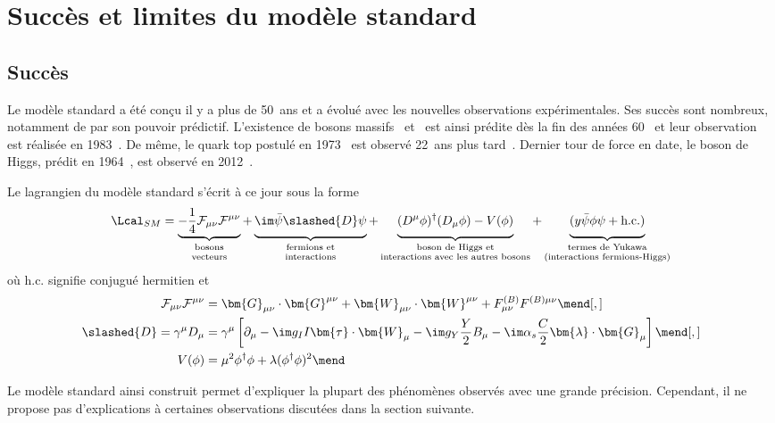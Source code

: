 \section{Succès et limites du modèle standard}\label{chapter-MS-MSSM-section-succes_limites}
\subsection{Succès}\label{chapter-MS-MSSM-section-succes_limites-subsec-succes}
Le modèle standard a été conçu il y a plus de 50~ans et a évolué avec les nouvelles observations expérimentales.
Ses succès sont nombreux, notamment de par son pouvoir prédictif.
L'existence de bosons massifs \Wboson\ et \Zboson\ est ainsi prédite dès la fin des années 60~\cite{Weinberg_leptons_model} et leur observation est réalisée en 1983~\cite{Wboson_discovery1,Wboson_discovery2,Wboson_discovery3,Zboson_discovery1,Zboson_discovery2}.
De même, le quark top postulé en 1973~\cite{CKM_KM} est observé 22~ans plus tard~\cite{top_discovery1,top_discovery2}.
Dernier tour de force en date, le boson de Higgs, prédit en 1964~\cite{Englert_Brout,Higgs_1,Higgs_2,Guralnik_Hagen_Kibble}, est observé en 2012~\cite{ATLAS_Higgs_discovery,CMS_Higgs_discovery}.
\par Le lagrangien du modèle standard s'écrit à ce jour sous la forme
\begin{equation}
\Lcal_{SM} = 
\underbrace{- \frac{1}{4} \mathcal{F}_{\mu\nu}\mathcal{F}^{\mu\nu} \vphantom{\frac{1}{4}}}_{\substack{\text{bosons\vphantom{YHg}}\\\text{vecteurs\vphantom{(lHg)}}}}
+ \underbrace{\im \bar{\psi} \slashed{D} \psi \vphantom{\frac{1}{4}}}_{\substack{\text{fermions et\vphantom{YHg}}\\\text{interactions\vphantom{(lHg)}}}}
+ \underbrace{(D^\mu\phi)^\dagger(D_\mu\phi) - V(\phi) \vphantom{\frac{1}{4}}}_{\substack{\text{boson de Higgs et\vphantom{YHg}}\\\text{interactions avec les autres bosons\vphantom{(lHg)}}}}
+ \underbrace{(y \bar{\psi}\phi\psi + \text{h.c.}) \vphantom{\frac{1}{4}}}_{\substack{\text{termes de Yukawa\vphantom{YHg}}\\\text{(interactions fermions-Higgs)\vphantom{(lHg)}}}}
\label{eq-SM_lagrangian}
\end{equation}
où \og $\text{h.c.}$ \fg{} signifie conjugué hermitien et
\begin{align}
\mathcal{F}_{\mu\nu}\mathcal{F}^{\mu\nu} &= \bm{G}_{\mu\nu} \cdot \bm{G}^{\mu\nu} + \bm{W}_{\mu\nu} \cdot \bm{W}^{\mu\nu} + F^{(B)}_{\mu\nu} F^{(B)\mu\nu}
\mend[,]\\
\slashed{D} = \gamma^\mu D_\mu &= \gamma^\mu \left[ \partial_\mu - \im g_I I \bm{\tau}\cdot\bm{W}_\mu - \im g_Y \frac{Y}{2} B_\mu - \im \alpha_s \frac{C}{2} \bm{\lambda}\cdot\bm{G}_\mu \right]
\mend[,]\\
V(\phi) &= \mu^2\phi^\dagger\phi + \lambda (\phi^\dagger\phi)^2
\mend
\end{align}
\par Le modèle standard ainsi construit permet d'expliquer la plupart des phénomènes observés avec une grande précision.
Cependant, il ne propose pas d'explications à certaines observations discutées dans la section suivante.
